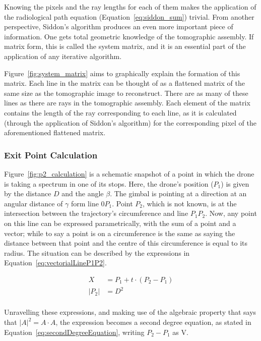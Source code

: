 Knowing the pixels and the ray lengths for each of them makes the
application of the radiological path equation
(Equation~\ref{eq:siddon_sum}) trivial. From another perspective,
Siddon's algorithm produces an even more important piece of information.
One gets total geometric knowledge of the tomographic assembly. If
matrix form, this is called the system matrix, and it is an essential
part of the application of any iterative algorithm.

Figure~\ref{fig:system_matrix} aims to graphically explain the formation
of this matrix. Each line in the matrix can be thought of as a flattened
matrix of the same size as the tomographic image to reconstruct. There
are as many of these lines as there are rays in the tomographic
assembly. Each element of the matrix contains the length of the ray
corresponding to each line, as it is calculated (through the application
of Siddon's algorithm) for the corresponding pixel of the aforementioned
flattened matrix.

\subsubsection{Exit Point Calculation}%
\label{ssub:exit_point_calculation}

Figure~\ref{fig:p2_calculation} is a schematic snapshot of a point in
which the drone is taking a spectrum in one of its stops. Here, the
drone's position ($P_1$) is given by the distance $D$ and the angle
$\beta$. The gimbal is pointing at a direction at an angular distance of
$\gamma$ form line $0P_1$. Point $P_2$, which is not known, is at the
intersection between the trajectory's circumference and line $P_1P_2$.
Now, any point on this line can be expressed parametrically, with the
sum of a point and a vector; while to say a point is on a circumference
is the same as saying the distance between that point and the centre of
this circumference is equal to its radius. The situation can be
described by the expressions in Equation~\ref{eq:vectorialLineP1P2}.

\begin{equation}
    \label{eq:vectorialLineP1P2}
    \begin{aligned}
        X &= P_1 + t \cdot (P_2 - P_1)\\
    |P_2| &= D^2\\ 
    \end{aligned}
\end{equation}

Unravelling these expressions, and making use of the algebraic property
that says that $|A|^2 = A \cdot A$, the expression becomes a second
degree equation, as stated in Equation~\ref{eq:secondDegreeEquation},
writing $P_2 - P_1$ as V.

